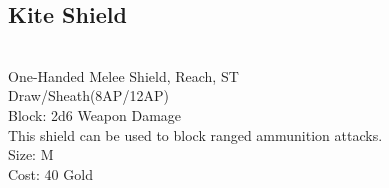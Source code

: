 \subsection{Kite Shield}\label{weapon:kiteShield}\\
One-Handed Melee Shield,  Reach, ST\\
Draw/Sheath(8AP/12AP)\\
Block: 2d6 Weapon Damage\\
This shield can be used to block ranged ammunition attacks.\\
Size: M\\
Cost: 40 Gold\\
